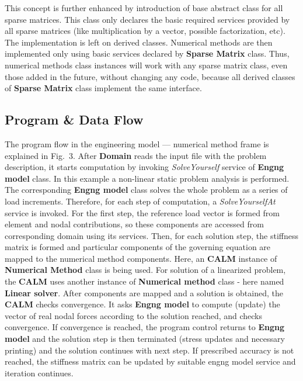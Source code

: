 \documentclass[a4paper]{article}
\newcommand{\class}[1]{{\bf #1}}
\newcommand{\service}[1]{{\em #1}}
\begin{document}
This concept is further enhanced by introduction of base abstract
class for all sparse matrices. This class only declares the basic
required services provided by all sparse matrices (like multiplication
by a vector, possible factorization, etc). The implementation is left on
derived classes.  Numerical methods are then implemented only
using basic services declared by \class{Sparse Matrix} class. Thus, numerical
methods class instances will work with any sparse matrix class, even
those added in the future, without changing any code, because all derived
classes of \class{Sparse Matrix} class implement the same interface.

\subsection {Program \& Data Flow}
The program flow in the engineering model --- numerical method frame is 
explained in Fig.~3. After \class{Domain} reads the input file with
the problem description,
it starts computation by invoking \service{SolveYourself} service of \class{Engng
model} class. In this example a non-linear static problem
analysis is performed. The corresponding \class{Engng model} class solves the whole problem
as a series of load increments. Therefore, for each step of computation,
a \service{SolveYourselfAt} service is invoked. For the first step, the reference
load vector is formed from element and nodal contributions, so these
components are accessed from corresponding domain using its
services. Then, for each solution step,  the stiffness matrix is formed
and particular components of the governing equation are mapped to
the numerical method components. Here, an \class{CALM} instance of \class{Numerical
Method} class is being used. For solution of a linearized problem, the
\class{CALM} uses another instance of \class{Numerical method} class - here named
\class{Linear solver}. After components are mapped and a solution is obtained,
the \class{CALM} checks convergence. It asks \class{Engng model} to compute
(update) the vector of real nodal forces according to the solution reached,
and checks convergence. If convergence is reached, the program control
returns to \class{Engng model} and the solution step is then terminated (stress
updates and necessary printing) and the solution continues with next
step. If prescribed accuracy is not reached, the stiffness matrix can be
updated by suitable engng model service and iteration continues. 
\end{document}
